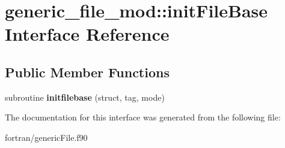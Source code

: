 \hypertarget{interfacegeneric__file__mod_1_1init_file_base}{}\section{generic\+\_\+file\+\_\+mod\+:\+:init\+File\+Base Interface Reference}
\label{interfacegeneric__file__mod_1_1init_file_base}
\subsection*{Public Member Functions}
\begin{DoxyCompactItemize}
\item 
\mbox{\label{interfacegeneric__file__mod_1_1init_file_base_a9c21d04c131ebb4889bc52a877bc4b5f}} 
subroutine {\bfseries initfilebase} (struct, tag, mode)
\end{DoxyCompactItemize}


The documentation for this interface was generated from the following file\+:\begin{DoxyCompactItemize}
\item 
fortran/generic\+File.\+f90\end{DoxyCompactItemize}
